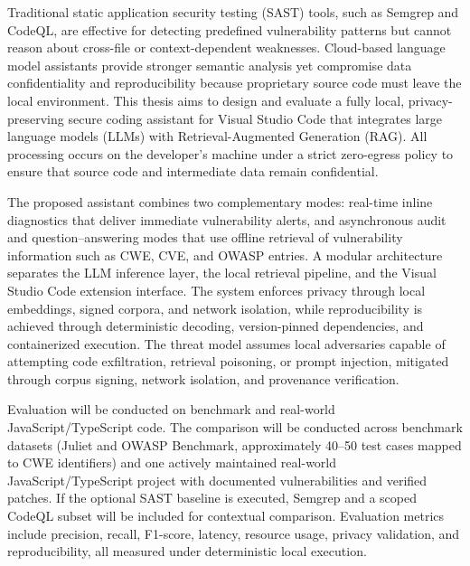 Traditional static application security testing (SAST) tools, such as Semgrep and CodeQL, are effective for detecting predefined vulnerability patterns but cannot reason about cross-file or context-dependent weaknesses. Cloud-based language model assistants provide stronger semantic analysis yet compromise data confidentiality and reproducibility because proprietary source code must leave the local environment. This thesis aims to design and evaluate a fully local, privacy-preserving secure coding assistant for Visual Studio Code that integrates large language models (LLMs) with Retrieval-Augmented Generation (RAG). All processing occurs on the developer's machine under a strict zero-egress policy to ensure that source code and intermediate data remain confidential.

The proposed assistant combines two complementary modes: real-time inline diagnostics that deliver immediate vulnerability alerts, and asynchronous audit and question--answering modes that use offline retrieval of vulnerability information such as CWE, CVE, and OWASP entries. A modular architecture separates the LLM inference layer, the local retrieval pipeline, and the Visual Studio Code extension interface. The system enforces privacy through local embeddings, signed corpora, and network isolation, while reproducibility is achieved through deterministic decoding, version-pinned dependencies, and containerized execution. The threat model assumes local adversaries capable of attempting code exfiltration, retrieval poisoning, or prompt injection, mitigated through corpus signing, network isolation, and provenance verification.

Evaluation will be conducted on benchmark and real-world JavaScript/TypeScript code. The comparison will be conducted across benchmark datasets (Juliet and OWASP Benchmark, approximately 40--50 test cases mapped to CWE identifiers) and one actively maintained real-world JavaScript/TypeScript project with documented vulnerabilities and verified patches. If the optional SAST baseline is executed, Semgrep and a scoped CodeQL subset will be included for contextual comparison. Evaluation metrics include precision, recall, F1-score, latency, resource usage, privacy validation, and reproducibility, all measured under deterministic local execution.
